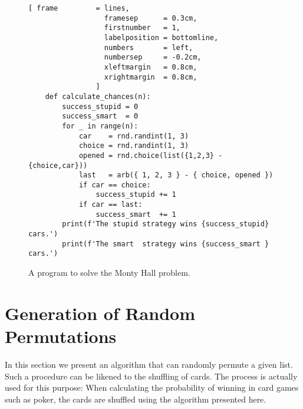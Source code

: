\begin{figure}[!ht]
\centering
\begin{Verbatim}[ frame         = lines, 
                  framesep      = 0.3cm, 
                  firstnumber   = 1,
                  labelposition = bottomline,
                  numbers       = left,
                  numbersep     = -0.2cm,
                  xleftmargin   = 0.8cm,
                  xrightmargin  = 0.8cm,
                ]
    def calculate_chances(n):
        success_stupid = 0
        success_smart  = 0
        for _ in range(n):
            car    = rnd.randint(1, 3)
            choice = rnd.randint(1, 3) 
            opened = rnd.choice(list({1,2,3} - {choice,car}))
            last   = arb({ 1, 2, 3 } - { choice, opened })
            if car == choice:
                success_stupid += 1
            if car == last:
                success_smart  += 1
        print(f'The stupid strategy wins {success_stupid} cars.')
        print(f'The smart  strategy wins {success_smart } cars.')
\end{Verbatim}
\vspace*{-0.3cm}
\caption{A program to solve the Monty Hall problem.}
\label{fig:Monty-Hall-Problem.ipynb}
\end{figure}





\section[Permutations]{Generation of Random Permutations}
In this section we present an algorithm that can randomly permute a given list.
Such a procedure can be likened to the shuffling of cards. The process is actually used for this purpose: When
calculating the probability of winning in card games such as poker, the cards are shuffled using the algorithm
presented here. 

